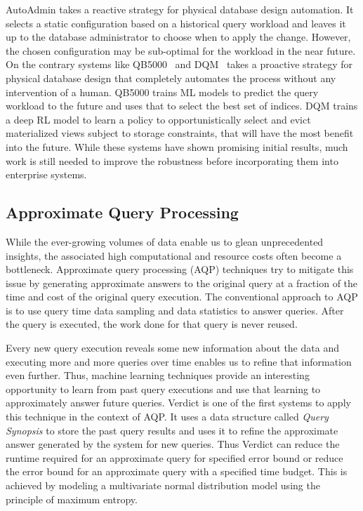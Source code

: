 AutoAdmin takes a reactive strategy for physical database design automation. 
It selects a static configuration based on a historical query workload and leaves it up to the database administrator to choose when to apply the change.
However, the chosen configuration may be sub-optimal for the workload in the near future.
On the contrary systems like QB5000~\cite{qb5000} and DQM~\cite{dqm} takes a proactive strategy for physical database design that completely automates the process without any intervention of a human.
QB5000 trains ML models to predict the query workload to the future and uses that to select the best set of indices.
DQM trains a deep RL model to learn a policy to opportunistically select and evict materialized views subject to storage constraints, that will have the most benefit into the future.
While these systems have shown promising initial results, much work is still needed to improve the robustness before incorporating them into enterprise systems.

\subsection{Approximate Query Processing}
While the ever-growing volumes of data enable us to glean unprecedented insights, the associated high computational and resource costs often become a bottleneck.
Approximate query processing (AQP) techniques try to mitigate this issue by generating approximate answers to the original query at a fraction of the time and cost of the original query execution.
The conventional approach to AQP is to use query time data sampling and data statistics to answer queries.
After the query is executed, the work done for that query is never reused.

Every new query execution reveals some new information about the data and executing more and more queries over time enables us to refine that information even further.
Thus, machine learning techniques provide an interesting opportunity to learn from past query executions and use that learning to approximately answer future queries.
Verdict \cite{verdict} is one of the first systems to apply this technique in the context of AQP.
It uses a data structure called \textit{Query Synopsis} to store the past query results and uses it to refine the approximate answer generated by the system for new queries.
Thus Verdict can reduce the runtime required for an approximate query for specified error bound or reduce the error bound for an approximate query with a specified time budget.
This is achieved by modeling a multivariate normal distribution model using the principle of maximum entropy.

